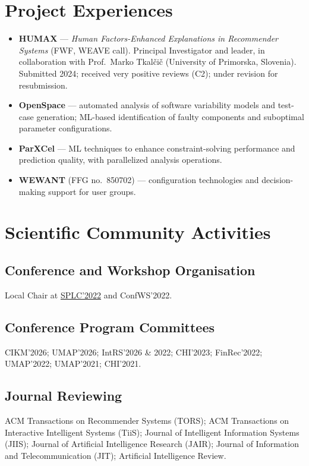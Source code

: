 \documentclass[11pt,a4paper]{article}
\begin{document}
\section{Project Experiences}
\begin{itemize}
  \item \textbf{HUMAX} --- \textit{Human Factors-Enhanced Explanations in Recommender Systems} (FWF, WEAVE call). Principal Investigator and leader, in collaboration with Prof.\ Marko Tkal\v{c}i\v{c} (University of Primorska, Slovenia). Submitted 2024; received very positive reviews (C2); under revision for resubmission.
  \item \textbf{OpenSpace} --- automated analysis of software variability models and test-case generation; ML-based identification of faulty components and suboptimal parameter configurations.
  \item \textbf{ParXCel} --- ML techniques to enhance constraint-solving performance and prediction quality, with parallelized analysis operations.
  \item \textbf{WEWANT} (FFG no.\ 850702) --- configuration technologies and decision-making support for user groups.
\end{itemize}

\section{Scientific Community Activities}
\subsection{Conference and Workshop Organisation}
Local Chair at \href{https://2022.splc.net/committees/organization/}{SPLC'2022} and ConfWS'2022.

\subsection{Conference Program Committees}
CIKM'2026; UMAP'2026; IntRS'2026 \& 2022; CHI'2023; FinRec'2022; UMAP'2022; UMAP'2021; CHI'2021.

\subsection{Journal Reviewing}
ACM Transactions on Recommender Systems (TORS); ACM Transactions on Interactive Intelligent Systems (TiiS);
Journal of Intelligent Information Systems (JIIS); Journal of Artificial Intelligence Research (JAIR);
Journal of Information and Telecommunication (JIT); Artificial Intelligence Review.
\end{document}
